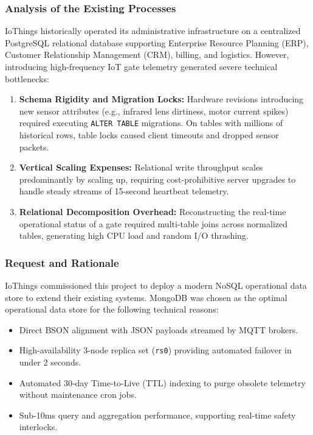 \documentclass[11pt,a4paper]{article}
\begin{document}
\subsubsection{Analysis of the Existing Processes}
IoThings historically operated its administrative infrastructure on a centralized PostgreSQL relational database supporting Enterprise Resource Planning (ERP), Customer Relationship Management (CRM), billing, and logistics. However, introducing high-frequency IoT gate telemetry generated severe technical bottlenecks:
\begin{enumerate}[noitemsep]
    \item \textbf{Schema Rigidity and Migration Locks:} Hardware revisions introducing new sensor attributes (e.g., infrared lens dirtiness, motor current spikes) required executing \texttt{ALTER TABLE} migrations. On tables with millions of historical rows, table locks caused client timeouts and dropped sensor packets.
    \item \textbf{Vertical Scaling Expenses:} Relational write throughput scales predominantly by scaling up, requiring cost-prohibitive server upgrades to handle steady streams of 15-second heartbeat telemetry.
    \item \textbf{Relational Decomposition Overhead:} Reconstructing the real-time operational status of a gate required multi-table joins across normalized tables, generating high CPU load and random I/O thrashing.
\end{enumerate}

\subsubsection{Request and Rationale}
IoThings commissioned this project to deploy a modern NoSQL operational data store to extend their existing systems. MongoDB was chosen as the optimal operational data store for the following technical reasons:
\begin{itemize}[noitemsep]
    \item Direct BSON alignment with JSON payloads streamed by MQTT brokers.
    \item High-availability 3-node replica set (\texttt{rs0}) providing automated failover in under 2 seconds.
    \item Automated 30-day Time-to-Live (TTL) indexing to purge obsolete telemetry without maintenance cron jobs.
    \item Sub-10ms query and aggregation performance, supporting real-time safety interlocks.
\end{itemize}
\end{document}
